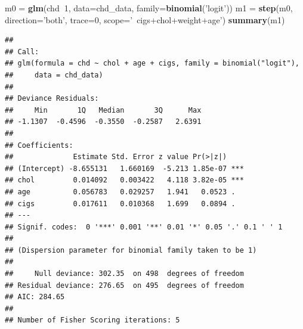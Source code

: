 \documentclass[
  ignorenonframetext,
]{beamer}
\newenvironment{Shaded}{\begin{snugshade}}{\end{snugshade}}
\newcommand{\DataTypeTok}[1]{\textcolor[rgb]{0.13,0.29,0.53}{#1}}
\newcommand{\DecValTok}[1]{\textcolor[rgb]{0.00,0.00,0.81}{#1}}
\newcommand{\KeywordTok}[1]{\textcolor[rgb]{0.13,0.29,0.53}{\textbf{#1}}}
\newcommand{\NormalTok}[1]{#1}
\newcommand{\OperatorTok}[1]{\textcolor[rgb]{0.81,0.36,0.00}{\textbf{#1}}}
\newcommand{\StringTok}[1]{\textcolor[rgb]{0.31,0.60,0.02}{#1}}
\begin{document}
\begin{frame}[fragile]

\tiny

\begin{Shaded}
\begin{Highlighting}[]
\NormalTok{m0 =}\StringTok{ }\KeywordTok{glm}\NormalTok{(chd}\OperatorTok{~}\DecValTok{1}\NormalTok{, }\DataTypeTok{data=}\NormalTok{chd_data, }\DataTypeTok{family=}\KeywordTok{binomial}\NormalTok{(}\StringTok{'logit'}\NormalTok{))}
\NormalTok{m1 =}\StringTok{ }\KeywordTok{step}\NormalTok{(m0, }\DataTypeTok{direction=}\StringTok{'both'}\NormalTok{, }\DataTypeTok{trace=}\DecValTok{0}\NormalTok{,}
          \DataTypeTok{scope=}\StringTok{'~cigs+chol+weight+age'}\NormalTok{)}
\KeywordTok{summary}\NormalTok{(m1)}
\end{Highlighting}
\end{Shaded}

\begin{verbatim}
## 
## Call:
## glm(formula = chd ~ chol + age + cigs, family = binomial("logit"), 
##     data = chd_data)
## 
## Deviance Residuals: 
##     Min       1Q   Median       3Q      Max  
## -1.1307  -0.4596  -0.3550  -0.2587   2.6391  
## 
## Coefficients:
##              Estimate Std. Error z value Pr(>|z|)    
## (Intercept) -8.655131   1.660169  -5.213 1.85e-07 ***
## chol         0.014092   0.003422   4.118 3.82e-05 ***
## age          0.056783   0.029257   1.941   0.0523 .  
## cigs         0.017611   0.010368   1.699   0.0894 .  
## ---
## Signif. codes:  0 '***' 0.001 '**' 0.01 '*' 0.05 '.' 0.1 ' ' 1
## 
## (Dispersion parameter for binomial family taken to be 1)
## 
##     Null deviance: 302.35  on 498  degrees of freedom
## Residual deviance: 276.65  on 495  degrees of freedom
## AIC: 284.65
## 
## Number of Fisher Scoring iterations: 5
\end{verbatim}

\normalsize

\end{frame}
\end{document}
